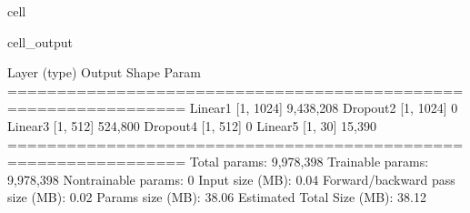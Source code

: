 \documentclass[letterpaper,10pt,english]{jupyterBook}
\begin{document}
\begin{sphinxuseclass}{cell}
\begin{sphinxVerbatimOutput}
\begin{sphinxuseclass}{cell_output}
\begin{sphinxVerbatim}[commandchars=\\\{\}]
\PYGZhy{}\PYGZhy{}\PYGZhy{}\PYGZhy{}\PYGZhy{}\PYGZhy{}\PYGZhy{}\PYGZhy{}\PYGZhy{}\PYGZhy{}\PYGZhy{}\PYGZhy{}\PYGZhy{}\PYGZhy{}\PYGZhy{}\PYGZhy{}\PYGZhy{}\PYGZhy{}\PYGZhy{}\PYGZhy{}\PYGZhy{}\PYGZhy{}\PYGZhy{}\PYGZhy{}\PYGZhy{}\PYGZhy{}\PYGZhy{}\PYGZhy{}\PYGZhy{}\PYGZhy{}\PYGZhy{}\PYGZhy{}\PYGZhy{}\PYGZhy{}\PYGZhy{}\PYGZhy{}\PYGZhy{}\PYGZhy{}\PYGZhy{}\PYGZhy{}\PYGZhy{}\PYGZhy{}\PYGZhy{}\PYGZhy{}\PYGZhy{}\PYGZhy{}\PYGZhy{}\PYGZhy{}\PYGZhy{}\PYGZhy{}\PYGZhy{}\PYGZhy{}\PYGZhy{}\PYGZhy{}\PYGZhy{}\PYGZhy{}\PYGZhy{}\PYGZhy{}\PYGZhy{}\PYGZhy{}\PYGZhy{}\PYGZhy{}\PYGZhy{}\PYGZhy{}
        Layer (type)               Output Shape         Param \PYGZsh{}
================================================================
            Linear\PYGZhy{}1                 [\PYGZhy{}1, 1024]       9,438,208
           Dropout\PYGZhy{}2                 [\PYGZhy{}1, 1024]               0
            Linear\PYGZhy{}3                  [\PYGZhy{}1, 512]         524,800
           Dropout\PYGZhy{}4                  [\PYGZhy{}1, 512]               0
            Linear\PYGZhy{}5                   [\PYGZhy{}1, 30]          15,390
================================================================
Total params: 9,978,398
Trainable params: 9,978,398
Non\PYGZhy{}trainable params: 0
\PYGZhy{}\PYGZhy{}\PYGZhy{}\PYGZhy{}\PYGZhy{}\PYGZhy{}\PYGZhy{}\PYGZhy{}\PYGZhy{}\PYGZhy{}\PYGZhy{}\PYGZhy{}\PYGZhy{}\PYGZhy{}\PYGZhy{}\PYGZhy{}\PYGZhy{}\PYGZhy{}\PYGZhy{}\PYGZhy{}\PYGZhy{}\PYGZhy{}\PYGZhy{}\PYGZhy{}\PYGZhy{}\PYGZhy{}\PYGZhy{}\PYGZhy{}\PYGZhy{}\PYGZhy{}\PYGZhy{}\PYGZhy{}\PYGZhy{}\PYGZhy{}\PYGZhy{}\PYGZhy{}\PYGZhy{}\PYGZhy{}\PYGZhy{}\PYGZhy{}\PYGZhy{}\PYGZhy{}\PYGZhy{}\PYGZhy{}\PYGZhy{}\PYGZhy{}\PYGZhy{}\PYGZhy{}\PYGZhy{}\PYGZhy{}\PYGZhy{}\PYGZhy{}\PYGZhy{}\PYGZhy{}\PYGZhy{}\PYGZhy{}\PYGZhy{}\PYGZhy{}\PYGZhy{}\PYGZhy{}\PYGZhy{}\PYGZhy{}\PYGZhy{}\PYGZhy{}
Input size (MB): 0.04
Forward/backward pass size (MB): 0.02
Params size (MB): 38.06
Estimated Total Size (MB): 38.12
\PYGZhy{}\PYGZhy{}\PYGZhy{}\PYGZhy{}\PYGZhy{}\PYGZhy{}\PYGZhy{}\PYGZhy{}\PYGZhy{}\PYGZhy{}\PYGZhy{}\PYGZhy{}\PYGZhy{}\PYGZhy{}\PYGZhy{}\PYGZhy{}\PYGZhy{}\PYGZhy{}\PYGZhy{}\PYGZhy{}\PYGZhy{}\PYGZhy{}\PYGZhy{}\PYGZhy{}\PYGZhy{}\PYGZhy{}\PYGZhy{}\PYGZhy{}\PYGZhy{}\PYGZhy{}\PYGZhy{}\PYGZhy{}\PYGZhy{}\PYGZhy{}\PYGZhy{}\PYGZhy{}\PYGZhy{}\PYGZhy{}\PYGZhy{}\PYGZhy{}\PYGZhy{}\PYGZhy{}\PYGZhy{}\PYGZhy{}\PYGZhy{}\PYGZhy{}\PYGZhy{}\PYGZhy{}\PYGZhy{}\PYGZhy{}\PYGZhy{}\PYGZhy{}\PYGZhy{}\PYGZhy{}\PYGZhy{}\PYGZhy{}\PYGZhy{}\PYGZhy{}\PYGZhy{}\PYGZhy{}\PYGZhy{}\PYGZhy{}\PYGZhy{}\PYGZhy{}
\end{sphinxVerbatim}

\end{sphinxuseclass}\end{sphinxVerbatimOutput}

\end{sphinxuseclass}
\end{document}
